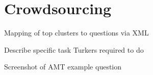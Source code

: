 \section{Crowdsourcing}

Mapping of top clusters to questions via XML \newline

\noindent Describe specific task Turkers required to do \newline

\noindent Screenshot of AMT example question





